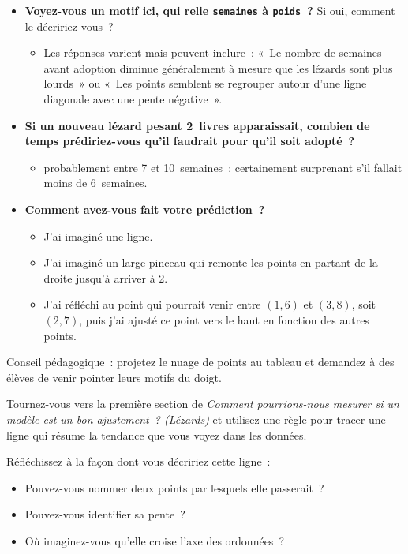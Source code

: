 \documentclass[12pt,a4paper]{article}
\begin{document}
\begin{thinkbox}
  \begin{itemize}
    \item \textbf{Voyez-vous un motif ici, qui relie \texttt{semaines} à \texttt{poids}~?} Si oui, comment le décririez-vous~?
    \begin{itemize}
      \item Les réponses varient mais peuvent inclure~: «~Le nombre de semaines avant adoption diminue généralement à mesure que les lézards sont plus lourds~» ou «~Les points semblent se regrouper autour d'une ligne diagonale avec une pente négative~».
    \end{itemize}
    \item \textbf{Si un nouveau lézard pesant 2~livres apparaissait, combien de temps prédiriez-vous qu'il faudrait pour qu'il soit adopté~?}
    \begin{itemize}
      \item probablement entre 7 et 10~semaines~; certainement surprenant s'il fallait moins de 6~semaines.
    \end{itemize}
    \item \textbf{Comment avez-vous fait votre prédiction~?}
    \begin{itemize}
      \item J'ai imaginé une ligne.
      \item J'ai imaginé un large pinceau qui remonte les points en partant de la droite jusqu'à arriver à 2.
      \item J'ai réfléchi au point qui pourrait venir entre $(1,6)$ et $(3,8)$, soit $(2,7)$, puis j'ai ajusté ce point vers le haut en fonction des autres points.
    \end{itemize}
  \end{itemize}
\end{thinkbox}

\begin{instructornotes}
  Conseil pédagogique~: projetez le nuage de points au tableau et demandez à des élèves de venir pointer leurs motifs du doigt.
\end{instructornotes}

\begin{activitybox}
  Tournez-vous vers la première section de \emph{Comment pourrions-nous mesurer si un modèle est un bon ajustement~? (Lézards)} et utilisez une règle pour tracer une ligne qui résume la tendance que vous voyez dans les données.

  Réfléchissez à la façon dont vous décririez cette ligne~:
  \begin{itemize}
    \item Pouvez-vous nommer deux points par lesquels elle passerait~?
    \item Pouvez-vous identifier sa pente~?
    \item Où imaginez-vous qu'elle croise l'axe des ordonnées~?
  \end{itemize}
\end{activitybox}
\end{document}
